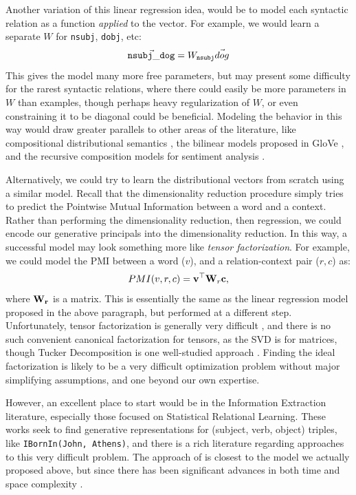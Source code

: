 \documentclass[12pt]{article}
\begin{document}
Another variation of this linear regression idea, would be to model each
syntactic relation as a function {\em applied} to the vector. For example,
we would learn a separate $W$ for {\tt nsubj}, {\tt dobj}, etc:
\begin{equation*}
  \vec{ {\tt nsubj\_dog} } = W_{{\tt nsubj}}\vec{dog}
\end{equation*}
This gives the model many more free parameters, but may present some difficulty
for the rarest syntactic relations, where there could easily be more parameters
in $W$ than examples, though perhaps heavy regularization of $W$, or even
constraining it to be diagonal could be beneficial. Modeling the behavior in
this way would draw greater parallels to other areas of the literature,
like compositional distributional semantics \cite{baroni:2010:emnlp,coecke:2011:la,grefenstette:2011:emnlp,baroni:2014:li}, the
bilinear models proposed in GloVe \cite{pennington:2014:emnlp}, and the recursive
composition models for sentiment analysis \cite{socher:2013:emnlp}.

Alternatively, we could  try to learn the distributional vectors from scratch
using a similar model. Recall that the dimensionality reduction procedure
simply tries to predict the Pointwise Mutual Information between a word and
a context. Rather than performing the dimensionality reduction, then regression,
we could encode our generative principals into the dimensionality reduction.
In this way, a successful model may look something more like {\em tensor
factorization}. For example, we could model the PMI between a word ($v$),
and a relation-context pair ($r, c$) as:
\begin{equation*}
  PMI(v, r, c) = {\bf v}^\top {\bf W}_{r} {\bf c},
\end{equation*}
where ${\bf W_r}$ is a matrix. This is essentially the same as the linear
regression model proposed in the above paragraph, but performed at a different
step. Unfortunately, tensor factorization is generally very difficult
\cite{haastad:1990:ja,hillar:2013:jacm}, and there is no such convenient canonical factorization for
tensors, as the SVD is for matrices, though Tucker Decomposition
is one well-studied approach \cite{tucker:1966:psy}. Finding the ideal
factorization is likely to be a very difficult optimization problem without
major simplifying assumptions, and one beyond our own expertise.

However, an excellent place to start would be in the Information Extraction
literature, especially those focused on Statistical Relational Learning. These
works seek to find generative representations for (subject, verb, object)
triples, like {\tt IBornIn(John, Athens)}, and there is a rich literature
regarding approaches to this very difficult problem.
The approach of  is closest to the model we actually
proposed above, but since there has been significant advances in both time
and space complexity
\cite{socher:2013:nips,riedel:2013:naacl,yang:2014:iclr,kuleshov:2015:aistats,trouillon:2016:icml}.
\end{document}
